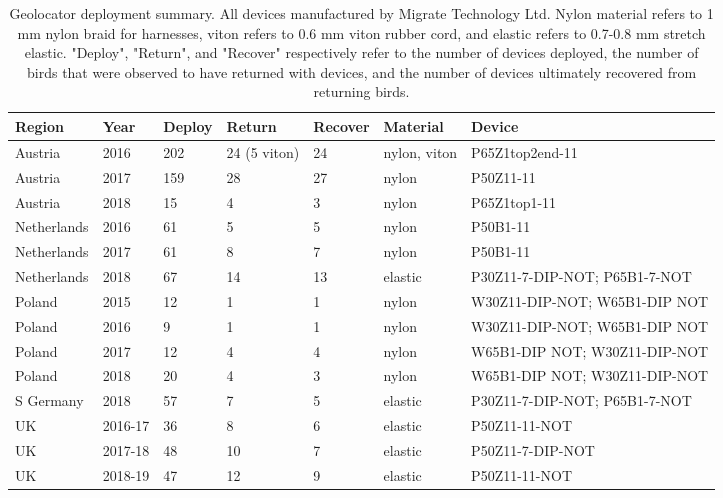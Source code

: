 \documentclass[a4paper, nobind]{templates/ociamthesis}
\begin{document}
\begin{table}[t]

\caption{\label{tab:capture-recapture-table}Geolocator deployment summary. All devices manufactured by Migrate Technology Ltd. Nylon material refers to 1 mm nylon braid for harnesses, viton refers to 0.6 mm viton rubber cord, and elastic refers to 0.7-0.8 mm stretch elastic. "Deploy", "Return", and "Recover" respectively refer to the number of devices deployed, the number of birds that were observed to have returned with devices, and the number of devices ultimately recovered from returning birds.}
\centering
\fontsize{9.5}{11.5}\selectfont
\begin{tabular}{l|l|l|l|l|l|>{\raggedright\arraybackslash}p{9em}}
\hline
Region & Year & Deploy & Return & Recover & Material & Device\\
\hline
Austria & 2016 & 202 & 24 (5 viton) & 24 & nylon, viton & P65Z1top2end-11\\
\hline
Austria & 2017 & 159 & 28 & 27 & nylon & P50Z11-11\\
\hline
Austria & 2018 & 15 & 4 & 3 & nylon & P65Z1top1-11\\
\hline
Netherlands & 2016 & 61 & 5 & 5 & nylon & P50B1-11\\
\hline
Netherlands & 2017 & 61 & 8 & 7 & nylon & P50B1-11\\
\hline
Netherlands & 2018 & 67 & 14 & 13 & elastic & P30Z11-7-DIP-NOT; P65B1-7-NOT\\
\hline
Poland & 2015 & 12 & 1 & 1 & nylon & W30Z11-DIP-NOT; W65B1-DIP NOT\\
\hline
Poland & 2016 & 9 & 1 & 1 & nylon & W30Z11-DIP-NOT; W65B1-DIP NOT\\
\hline
Poland & 2017 & 12 & 4 & 4 & nylon & W65B1-DIP NOT; W30Z11-DIP-NOT\\
\hline
Poland & 2018 & 20 & 4 & 3 & nylon & W65B1-DIP NOT; W30Z11-DIP-NOT\\
\hline
S Germany & 2018 & 57 & 7 & 5 & elastic & P30Z11-7-DIP-NOT; P65B1-7-NOT\\
\hline
UK & 2016-17 & 36 & 8 & 6 & elastic & P50Z11-11-NOT\\
\hline
UK & 2017-18 & 48 & 10 & 7 & elastic & P50Z11-7-DIP-NOT\\
\hline
UK & 2018-19 & 47 & 12 & 9 & elastic & P50Z11-11-NOT\\
\hline
\end{tabular}
\end{table}

\clearpage \printbibliography[segment=  herefsection,heading=subbibliography]
\end{document}

